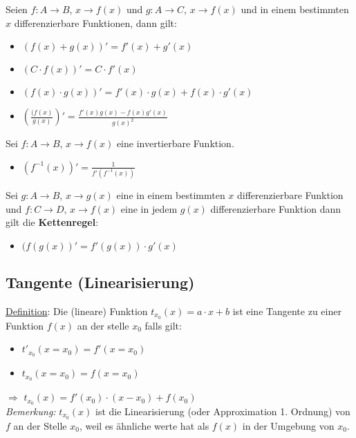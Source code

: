 \documentclass[11pt]{article} %
\begin{document}
Seien $f: A \rightarrow B$, $x \rightarrow f(x)$ und $g: A \rightarrow C$, $x \rightarrow f(x)$  und in einem bestimmten $x$ differenzierbare Funktionen, dann gilt:
\begin{itemize}
\item $(f(x) + g(x))' = f'(x) + g'(x)$
\item $(C\cdot f(x))' = C\cdot f'(x)$
\item $(f(x)\cdot g(x))' = f'(x)\cdot g(x) + f(x) \cdot g'(x)$
\item $(\frac{(f(x)}{g(x)})' = \frac{f'(x)g(x)-f(x)g'(x)}{g(x)^2}$\\

\end{itemize}

Sei $f: A \rightarrow B$, $x \rightarrow f(x)$ eine invertierbare Funktion.
\begin{itemize}
\item $(f^{-1}(x))'=\frac{1}{f'(f^{-1}(x))}$\\
\end{itemize}

Sei $g: A \rightarrow B$, $x \rightarrow g(x)$ eine in einem bestimmten $x$ differenzierbare Funktion und $f: C \rightarrow D$, $x \rightarrow f(x)$ eine in jedem $g(x)$ differenzierbare Funktion dann gilt die {\bf Kettenregel}:
\begin{itemize}
\item $(f(g(x))'=f'(g(x))\cdot g'(x)$\\
\end{itemize}


\subsection{Tangente (Linearisierung)}

\underline{Definition}: Die (lineare) Funktion $t_{x_0}(x) = a\cdot x + b$ ist eine Tangente zu einer Funktion $f(x)$ an der stelle  $x_0$ falls gilt:

\begin{itemize}
\item $t'_{x_0}(x=x_0)=f'(x=x_0)$
\item $t_{x_0}(x=x_0) = f(x=x_0)$
\end{itemize}
$\Rightarrow$ $t_{x_0}(x) = f'(x_0)\cdot (x-x_0) + f(x_0)$\\

\emph{Bemerkung:} $t_{x_0}(x)$ ist die Linearisierung (oder Approximation 1. Ordnung) von $f$ an der Stelle $x_0$, weil es ähnliche werte hat als $f(x)$ in der Umgebung von $x_0$.
\end{document}
